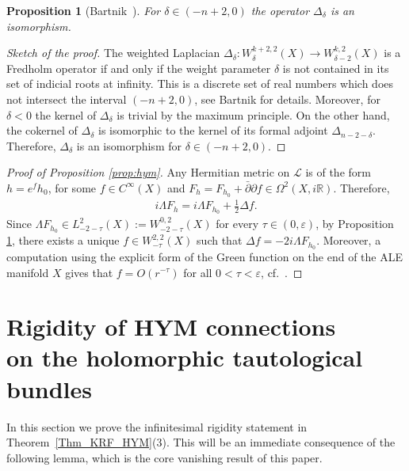 \documentclass[pdftex]{sigma}
\numberwithin{equation}{section}
\newcommand{\cL}{\mathcal{L}}
\newcommand{\R}{{\mathbb R}}
\renewcommand{\epsilon}{\varepsilon}
\newcommand{\eps}{\epsilon}
\newcommand{\delbar}{\bar \del}
\newcommand{\del}{\partial}
\newtheorem{Proposition}[Theorem]{Proposition}
 { \theoremstyle{definition}
\newtheorem{Definition}[Theorem]{Definition}
\newtheorem{Remark}[Theorem]{Remark} }
\begin{document}
\begin{Proposition}[Bartnik~]\label{prop:Laplace}
  For $\delta\in(-n+2,0)$ the operator $\Delta_{\delta}$ is an isomorphism.
\end{Proposition}

\begin{proof}[Sketch of the proof]
  The weighted Laplacian $\Delta_\delta \colon W^{k+2,2}_\delta(X) \to W^{k,2}_{\delta-2}(X)$ is a Fredholm operator if and only if the weight parameter $\delta$ is not contained in its set of indicial roots at inf\/inity.
  This is a discrete set of real numbers which does not intersect the
  interval $(-n+2, 0)$, see Bartnik \cite[Sections~1 and~2]{Bartnik1986} for details.  Moreover, for $\delta<0$ the kernel of
  $\Delta_\delta$ is trivial by the maximum principle.  On the other
  hand, the cokernel of $\Delta_{\delta}$ is isomorphic to the kernel
  of its formal adjoint $\Delta_{n-2-\delta}$.  Therefore,
  $\Delta_\delta$ is an isomorphism for $\delta \in (-n+2,0)$.
\end{proof}

\begin{proof}[Proof of Proposition \ref{prop:hym}]
  Any Hermitian metric on $\cL$ is of the form $h = e^f h_0$, for some
  $f \in C^\infty(X)$ and $F_h=F_{h_0} + \delbar\del f \in
  \Omega^2(X,i\R)$. Therefore,
  \begin{gather*}
    i\Lambda F_h = i\Lambda F_{h_0} + \tfrac12 \Delta f.
  \end{gather*}
  Since $\Lambda F_{h_0}\in L^2_{-2-\tau}(X):=W^{0,2}_{-2-\tau}(X)$ for
  every $\tau\in(0,\epsilon)$, by Proposition \ref{prop:Laplace},
  there exists a unique $f\in W^{2,2}_{-\tau}(X)$ such that $\Delta f
  =-2i\Lambda F_{h_0}$. Moreover, a computation using the explicit
  form of the Green function on the end of the ALE manifold $X$ gives
  that $f=O(r^{-{\tau}})$ for all $0<\tau<\eps$, cf.~\cite[(proof of) Theorem~8.3.5]{Joyce2000}.
  \end{proof}


\section[Rigidity of HYM connections on the holomorphic tautological bundles]{Rigidity of HYM connections\\ on the holomorphic tautological bundles}\label{sec:rigid}

In this section we prove the inf\/initesimal rigidity statement in
Theorem~\ref{Thm_KRF_HYM}(3).  This will be an immediate
consequence of the following lemma, which is the core vanishing result
of this paper.
\end{document}
